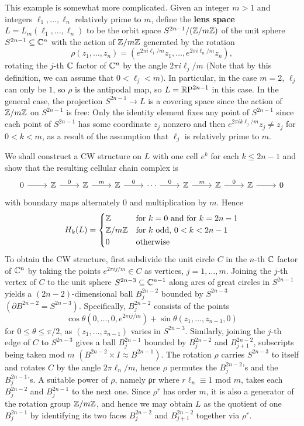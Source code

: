 \begin{example}
This example is somewhat more complicated. Given an integer $m>1$ and integers $\ell_1,\dots,\ell_n$ relatively prime to $m$, define the \textbf{lens space} $L=L_m(\ell_1,\dots,\ell_n)$ to be the orbit space $S^{2n-1}/(\Z/m\Z)$ of the unit sphere $S^{2n-1}\sub\C^n$ with the action of $\Z/m\Z$ generated by the rotation 
\[\rho(z_1,\dots,z_n)=(e^{2\pi i\ell_1/m}z_1,\dots,e^{2\pi i\ell_n/m}z_n),\]
rotating the $j$-th $\C$ factor of $\C^n$ by the angle $2\pi i\ell_j/m$ $($Note that by this definition, we can assume that $0<\ell_j<m$$)$. In particular, in the case $m=2$, $\ell_j$ can only be $1$, so $\rho$ is the antipodal map, so $L=\RP^{2n-1}$ in this case. In the general case, the projection $S^{2n-1}\to L$ is a covering space since the action of $\Z/m\Z$ on $S^{2n-1}$ is free: Only the identity element fixes any point of $S^{2n-1}$ since each point of $S^{2n-1}$ has some coordinate $z_j$
nonzero and then $e^{2\pi ik\ell_j/m}z_j\neq z_j$ for $0<k<m$, as a result of the assumption that $\ell_j$ is relatively prime to $m$.\par
We shall construct a CW structure on $L$ with one cell $e^k$ for each $k\leq 2n-1$ and show that the resulting cellular chain complex is
\[\begin{tikzcd}
0\ar[r]&\Z\ar[r,"0"]&\Z\ar[r,"m"]&\Z\ar[r,"0"]&\cdots\ar[r,"0"]&\Z\ar[r,"m"]&\Z\ar[r,"0"]&\Z\ar[r]&0
\end{tikzcd}\]
with boundary maps alternately $0$ and multiplication by $m$. Hence
\[H_k(L)=\begin{cases}
\mathbb{Z}&\text{for $k=0$ and for $k=2n-1$}\\
\mathbb{Z}/m\mathbb{Z}&\text{for $k$ odd, $0<k<2n-1$}\\
0&\text{otherwise}
\end{cases}\]
To obtain the CW structure, first subdivide the unit circle $C$ in the $n$-th $\C$ factor of $\C^n$ by taking the points $e^{2\pi ij/m}\in C$ as vertices, $j=1,\dots,m$. Joining the $j$-th vertex of $C$ to the unit sphere $S^{2n-3}\sub\C^{n-1}$ along arcs of great circles in $S^{2n-1}$ yields a $(2n-2)$-dimensional ball $B^{2n-2}_j$ bounded by $S^{2n-3}$ $(\partial B^{2n-2}=S^{2n-3})$. Specifically, $B^{2n-2}_j$ consists of the points \[\cos\theta(0,\dots,0,e^{2\pi ij/m})+\sin\theta(z_1,\dots,z_{n-1},0)\] for $0\leq\theta\leq\pi/2$, as $(z_1,\dots,z_{n-1})$ varies in $S^{2n-3}$. Similarly, joining the $j$-th edge of $C$ to $S^{2n-3}$ gives a ball $B^{2n-1}_j$ bounded by $B^{2n-2}_j$ and $B^{2n-2}_{j+1}$, subscripts being taken mod $m$ $(B^{2n-2}\times I\approx B^{2n-1})$. The rotation $\rho$ carries $S^{2n-3}$ to itself and rotates $C$ by the angle $2\pi\ell_n/m$, hence $\rho$ permutes the $B^{2n-2}_j$'s and the $B^{2n-1}_j$'s. A suitable power of $\rho$, namely ρr where $r\ell_n\equiv 1$ mod $m$, takes each $B^{2n-2}_j$ and $B^{2n-1}_j$ to the next one. Since $\rho^r$ has order $m$, it is also a generator of the rotation group $\Z/m\Z$, and hence we may obtain $L$ as the quotient of one $B^{2n-1}_j$ by identifying its two faces $B^{2n-2}_j$ and $B^{2n-2}_{j+1}$ together via $\rho^r$.\par
$$
\end{example}
